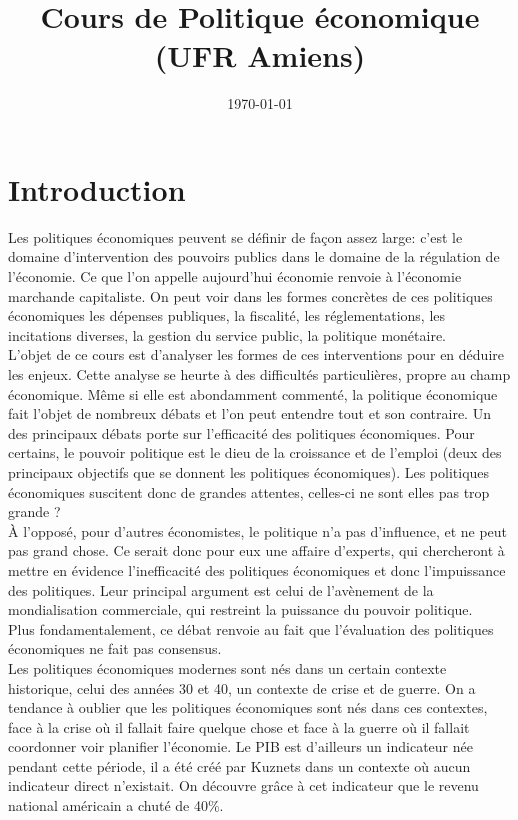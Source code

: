 \documentclass[10pt, a4paper, openany]{book}
\date{\today}
\title{Cours de Politique économique (UFR Amiens)}
\begin{document}
\maketitle
\tableofcontents

\chapter{Introduction}

Les politiques économiques peuvent se définir de façon assez large: c'est le domaine d'intervention des pouvoirs publics dans le domaine de la régulation de l'économie. Ce que l'on appelle aujourd'hui économie renvoie à l'économie marchande capitaliste. On peut voir dans les formes concrètes de ces politiques économiques les dépenses publiques, la fiscalité, les réglementations, les incitations diverses, la gestion du service public, la politique monétaire. \\
L'objet de ce cours est d'analyser les formes de ces interventions pour en déduire les enjeux. Cette analyse se heurte à des difficultés particulières, propre au champ économique. Même si elle est abondamment commenté, la politique économique fait l'objet de nombreux débats et l'on peut entendre tout et son contraire. Un des principaux débats porte sur l'efficacité des politiques économiques. Pour certains, le pouvoir politique est le dieu de la croissance et de l'emploi (deux des principaux objectifs que se donnent les politiques économiques). Les politiques économiques suscitent donc de grandes attentes, celles-ci ne sont elles pas trop grande ? \\
À l'opposé, pour d'autres économistes, le politique n'a pas d'influence, et ne peut pas grand chose. Ce serait donc pour eux une affaire d'experts, qui chercheront à mettre en évidence l'inefficacité des politiques économiques et donc l'impuissance des politiques. Leur principal argument est celui de l'avènement de la mondialisation commerciale, qui restreint la puissance du pouvoir politique. \\
Plus fondamentalement, ce débat renvoie au fait que l'évaluation des politiques économiques ne fait pas consensus. \\
Les politiques économiques modernes sont nés dans un certain contexte historique, celui des années 30 et 40, un contexte de crise et de guerre. On a tendance à oublier que les politiques économiques sont nés dans ces contextes, face à la crise où il fallait faire quelque chose et face à la guerre où il fallait coordonner voir planifier l'économie. Le PIB est d'ailleurs un indicateur née pendant cette période, il a été créé par Kuznets dans un contexte où aucun indicateur direct n'existait. On découvre grâce à cet indicateur que le revenu national américain a chuté de 40\%. 
\end{document}
